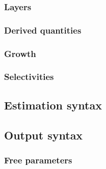 \subsubsection*{Layers}
\subsubsection*{Derived quantities}
\subsubsection*{Growth}
\subsubsection*{Selectivities}
\subsection*{Estimation syntax}
\subsection*{Output syntax}
\subsubsection*{Free parameters}
